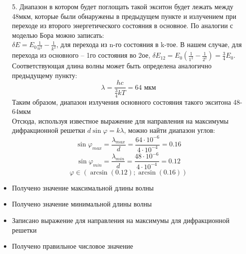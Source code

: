 \begin{enumerate}
\item[5.] Диапазон в котором будет поглощать такой экситон будет лежать между 48мкм, которые были обнаружены в предыдущем пункте и излучением при переходе из второго энергетического состояния в основное. По аналогии с моделью Бора можно записать:\\
$\delta E=E_0\frac{1}{n^2}-\frac{1}{k^2}$, для перехода из n-го состояния в k-тое. В нашем случае, для перехода из основного – 1го состояния во 2ое, $\delta E_12=E_0\left(\frac{1}{1^2}-\frac{1}{2^2}\right)=\frac{3}{4}E_0$.\\
Соответствующая длина волны может быть определена аналогично предыдущему пункту:\\
$$\lambda=\frac{hc}{\frac{3}{4}kT}=64\text{ мкм}$$
Таким образом, диапазон излучения основного состояния такого экситона 48-64мкм\\
Отсюда, используя известное выражение для направления на максимумы дифракционной решетки $d\sin\varphi=k\lambda$, можно найти диапазон углов:
$$\sin\varphi_{max}=\frac{\lambda_{max}}{d}=\frac{64\cdot10^{-6}}{4\cdot10^{-4}}=0.16$$					
$$\sin\varphi_{min}=\frac{\lambda_{min}}{d}=\frac{48\cdot10^{-6}}{4\cdot10^{-4}}=0.12$$
$$\varphi\in(\arcsin(0.12);\arcsin(0.16))$$
\end{enumerate}
\additionalCriteria
\begin{itemize}
\item Получено значение максимальной длины волны
\item Получено значение минимальной длины волны
\item Записано выражение для направления на максимумы для дифракционной решетки
\item Получено правильное числовое значение
\end{itemize}
